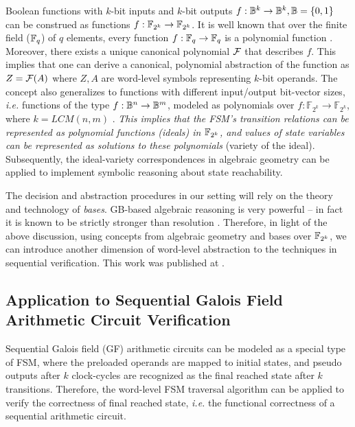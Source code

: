Boolean functions with $k$-bit inputs and $k$-bit outputs 
$f: {\mathbb{B}}^k \rightarrow {\mathbb{B}}^k,{\mathbb{B}} = \{0, 1\}$ can be construed as functions
$f: {\mathbb{F}}_{2^k} \rightarrow {\mathbb{F}}_{2^k}$. It is well known that over the finite
field (${\mathbb{F}}_{q}$) of  $q$ elements, every function $f: {\mathbb{F}}_{q}
\rightarrow {\mathbb{F}}_{q}$ is a polynomial function \cite{ff:1997}. Moreover,
there exists a unique canonical polynomial ${\mathcal{F}}$ that describes $f$.
This implies that one can derive a canonical, polynomial
  abstraction of the function as $Z = {\mathcal{F}}(A)$ where $Z, A$ are
word-level symbols representing $k$-bit operands. The concept also
generalizes to functions with different input/output bit-vector sizes,
{\it i.e.} functions of the type $f: {\mathbb{B}}^n \rightarrow {\mathbb{B}}^m$, modeled as
polynomials over $f:{\mathbb{F}}_{2^k} \rightarrow
{\mathbb{F}}_{2^k}$, where $k=LCM(n,m)$ \cite{ff:1997}.  
{\it This implies that the FSM's transition relations can be
represented as polynomial functions (ideals) in ${\mathbb{F}}_{2^k}$, and values of
state variables can be represented as solutions to these polynomials}
(variety of the ideal). Subsequently, the ideal-variety correspondences
in algebraic geometry can be applied to implement symbolic reasoning
about state reachability. 

The decision and abstraction procedures in our setting will rely on
the theory and technology of {\it \Grobner bases}. GB-based
algebraic reasoning is very powerful -- in fact it is known to be
strictly stronger than resolution \cite{CEI:stoc-96}. Therefore, in
light of the above discussion, using concepts from algebraic geometry
and \Grobner bases over ${\mathbb{F}}_{2^k}$, we can introduce another dimension of
word-level abstraction to the techniques in sequential verification. 
This work was published at \cite{myHLDVT}.

\subsection{Application to Sequential Galois Field Arithmetic Circuit Verification}
Sequential Galois field (GF) arithmetic circuits can be modeled as a special type of 
FSM, where the preloaded operands are mapped to initial states, and pseudo outputs
after $k$ clock-cycles are recognized as the final reached state after $k$ transitions.
Therefore, the word-level FSM traversal algorithm can be applied to 
verify the correctness of final reached state, {\it i.e.} the functional correctness of
a sequential arithmetic circuit.

